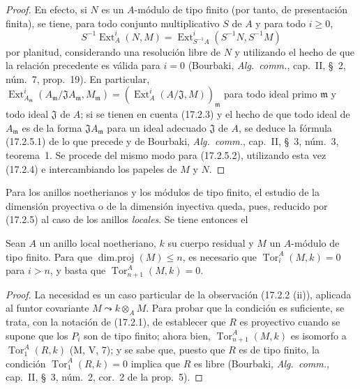 \begin{proof}
En efecto, si $N$ es un $A$-módulo de tipo finito (por tanto, de presentación finita),
se tiene, para todo conjunto multiplicativo $S$ de $A$ y para todo $i\geq0$,
\[
  S^{-1}\operatorname{Ext}^i_A(N,M)
  =\operatorname{Ext}^i_{S^{-1}A}(S^{-1}N,S^{-1}M)
\]
por planitud, considerando una resolución libre de $N$ y utilizando el
hecho de que la relación precedente es válida para $i=0$ (Bourbaki,
\emph{Alg.~comm.}, cap.~II, \S~2, núm.~7, prop.~19). En particular,
$\operatorname{Ext}^i_{A_{\mathfrak{m}}}
(A_{\mathfrak{m}}/\mathfrak{J}A_{\mathfrak{m}},M_{\mathfrak{m}})
=(\operatorname{Ext}^i_A(A/\mathfrak{J},M))_{\mathfrak{m}}$ para todo ideal
primo $\mathfrak{m}$ y todo ideal $\mathfrak{J}$ de $A$; si se tienen
en cuenta (17.2.3) y el hecho de que todo
ideal de $A_{\mathfrak{m}}$ es de la forma $\mathfrak{J}A_{\mathfrak{m}}$
para un ideal adecuado $\mathfrak{J}$ de $A$, se deduce la fórmula
(17.2.5.1) de lo que precede y de Bourbaki, \emph{Alg.~comm.}, cap.~II,
\S~3, núm.~3, teorema~1. Se procede del mismo modo para (17.2.5.2), utilizando esta vez
(17.2.4) e intercambiando los papeles de $M$ y $N$.
\end{proof}

Para los anillos noetherianos y los módulos de tipo finito, el estudio de la
dimensión proyectiva o de la dimensión inyectiva queda, pues, reducido por
(17.2.5) al caso de los anillos \emph{locales}. Se tiene entonces el

\begin{lemma}[17.2.6]
\label{0.17.2.6-fr}
Sean $A$ un anillo local noetheriano, $k$ su cuerpo residual y $M$ un
$A$-módulo de tipo finito. Para que $\operatorname{dim.proj}(M)\leq n$, es
necesario que $\operatorname{Tor}^A_i(M,k)=0$ para $i>n$, y basta que
$\operatorname{Tor}^A_{n+1}(M,k)=0$.
\end{lemma}

\begin{proof}
La necesidad es un caso particular de la observación (17.2.2 (ii)), aplicada al
funtor covariante $M\leadsto k\otimes_A M$. Para probar que la condición es
suficiente, se trata, con la notación de (17.2.1), de establecer que $R$ es
proyectivo cuando se supone que los $P_i$ son de tipo finito; ahora bien,
$\operatorname{Tor}^A_{n+1}(M,k)$ es isomorfo a
$\operatorname{Tor}^A_1(R,k)$ (M, V, 7); y se sabe que, puesto que $R$ es de
tipo finito, la condición $\operatorname{Tor}^A_1(R,k)=0$ implica que $R$ es
libre (Bourbaki, \emph{Alg.~comm.}, cap.~II, \S~3, núm.~2, cor.~2 de la
prop.~5).
\end{proof}

